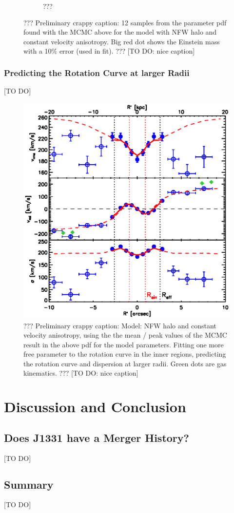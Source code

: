 \documentclass[useAMS,usenatbib]{mn2e}
\begin{document}
\begin{figure}
\begin{subfigure}{.5\textwidth}
  \caption{???}
  \label{fig:???}
\end{subfigure}
\caption{??? Preliminary crappy caption: 12 samples from the parameter pdf found with the MCMC above for the model with NFW halo and constant velocity anisotropy. Big red dot shows the Einstein mass with a 10\% error (used in fit). ??? [TO DO: nice caption]}
\label{fig:???}
\end{figure}



\subsubsection{Predicting the Rotation Curve at larger Radii}

[TO DO]

\begin{figure}
\centering
\includegraphics[width=0.7\linewidth]{fig/B4_rms_rot_curves_best_model.ps}
\caption{??? Preliminary crappy caption: Model: NFW halo and constant velocity anisotropy, using the the mean / peak values of the MCMC result in the above pdf for the model parameters. Fitting one more free parameter to the rotation curve in the inner regions, predicting the rotation curve and dispersion at larger radii. Green dots are gas kinematics. ??? [TO DO: nice caption]}
\label{fig:???}
\end{figure}

\section{Discussion and Conclusion}

\subsection{Does J1331 have a Merger History?}

[TO DO]

\subsection{Summary}

[TO DO]




\label{lastpage}
\end{document}
